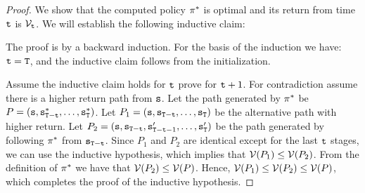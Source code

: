 \begin{proof}
We show that the computed policy $\pi^*$ is optimal and its
return from time ${\tt t}$ is $\mathcal{V}_{{\tt t}}$. We will establish
the following inductive claim:

\smallskip
{}

\smallskip
The proof is by a backward induction. For the basis of the induction
we have: ${\tt t}={\tt T}$, and the inductive claim follows from
the initialization.


Assume the inductive claim holds for ${\tt t}$ prove for ${\tt t}+1$.
For contradiction assume there is a higher return path from
${\tt s}$. Let the path generated by $\pi^*$ be
$P=({\tt s},{\tt s}^*_{{\tt T}-{\tt t}},\ldots,{\tt s}^*_{\tt T})$.
Let $P_1=({\tt s},{\tt s}_{{\tt T}-{\tt t}},\ldots,{\tt s}_{\tt T}
)$ be the alternative path with higher return. Let
$P_2=({\tt s},{\tt s}_{{\tt T}-{\tt t}},{\tt s}'_{{\tt T}-{\tt t}-1},
\ldots,{\tt s}'_{\tt T} )$ be the path generated by following
$\pi^*$ from ${\tt s}_{{\tt T}-{\tt t}}$. Since $P_1$ and $P_2$
are identical except for the last ${\tt t}$ stages, we can use the
inductive hypothesis, which implies that $\mathcal{V}(P_1)\leq
\mathcal{V}(P_2)$. From the definition of $\pi^*$ we have that
$\mathcal{V}(P_2)\leq \mathcal{V}(P)$. Hence, $\mathcal{V}(P_1)\leq \mathcal{V}(P_2)\leq
\mathcal{V}(P)$, which completes the proof of the inductive hypothesis.
%
\end{proof}

